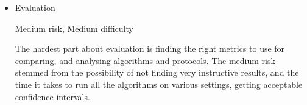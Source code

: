 \begin{itemize}
    \item Evaluation
    
    Medium risk, Medium difficulty
    
    The hardest part about evaluation is finding the right metrics to use for comparing, and analysing algorithms and protocols. The medium risk stemmed from the possibility of not finding very instructive results, and the time it takes to run all the algorithms on various settings, getting acceptable confidence intervals.
    
    
\end{itemize}